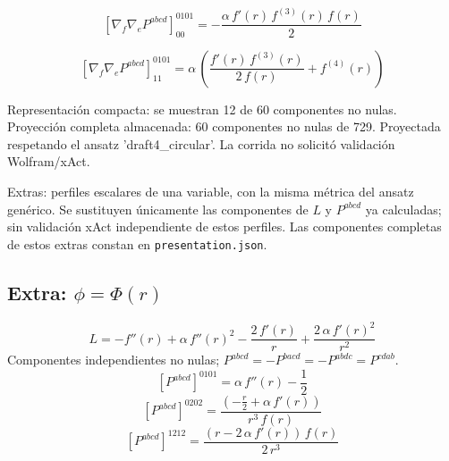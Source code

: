\documentclass[11pt]{article}
\begin{document}
\par\smallskip
\begin{dmath*}[breakdepth={5}]
\left[\nabla_f\nabla_e P^{abcd}\right]_{00}^{0101} = -\frac{\alpha\,f'\!\left(r\right)\,f^{(3)}\!\left(r\right)\,f\!\left(r\right)}{2}
\end{dmath*}
\par\smallskip
\begin{dmath*}[breakdepth={5}]
\left[\nabla_f\nabla_e P^{abcd}\right]_{11}^{0101} = \alpha\,\left(\frac{f'\!\left(r\right)\,f^{(3)}\!\left(r\right)}{2\,f\!\left(r\right)} + f^{(4)}\!\left(r\right)\right)
\end{dmath*}
\par\smallskip
Representación compacta: se muestran 12 de 60 componentes no nulas.
Proyección completa almacenada: 60 componentes no nulas de 729. Proyectada respetando el ansatz 'draft4\_circular'. La corrida no solicitó validación Wolfram/xAct.\par\medskip
\par\medskip Extras: perfiles escalares de una variable, con la misma métrica del ansatz genérico. Se sustituyen únicamente las componentes de $L$ y $P^{abcd}$ ya calculadas; sin validación xAct independiente de estos perfiles. Las componentes completas de estos extras constan en \texttt{presentation.json}.
\subsection*{Extra: $\phi=\Phi\!\left(r\right)$}
\begin{dmath*}[breakdepth={5}]
L=-f''\!\left(r\right) + \alpha\,{f''\!\left(r\right)}^{2} - \frac{2\,f'\!\left(r\right)}{r} + \frac{2\,\alpha\,{f'\!\left(r\right)}^{2}}{{r}^{2}}
\end{dmath*}
Componentes independientes no nulas; $P^{abcd}=-P^{bacd}=-P^{abdc}=P^{cdab}$.
\begin{dmath*}[breakdepth={5}]
\left[P^{abcd}\right]^{0101}=\alpha\,f''\!\left(r\right) - \frac{1}{2}
\end{dmath*}
\begin{dmath*}[breakdepth={5}]
\left[P^{abcd}\right]^{0202}=\frac{\left(-\frac{r}{2} + \alpha\,f'\!\left(r\right)\right)}{{r}^{3}\,f\!\left(r\right)}
\end{dmath*}
\begin{dmath*}[breakdepth={5}]
\left[P^{abcd}\right]^{1212}=\frac{\left(r - 2\,\alpha\,f'\!\left(r\right)\right)\,f\!\left(r\right)}{2\,{r}^{3}}
\end{dmath*}
\end{document}
